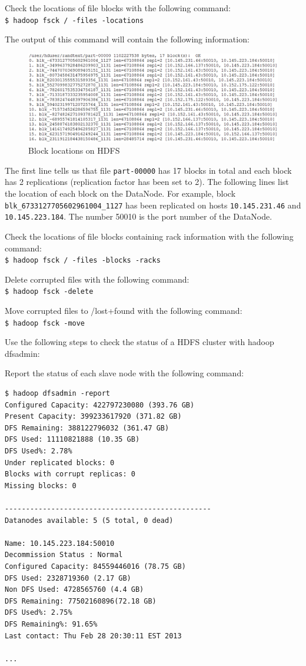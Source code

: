 Check the locations of file blocks with the following command: \\
\verb|$ hadoop fsck / -files -locations|

The output of this command will contain the following information:
\begin{figure}[h]
  \centering
  \includegraphics[width=\textwidth]{figs/5163os_04_07.png}
  \caption{Block locations on HDFS}\label{fig:hdfs.block.locations}
\end{figure} 

The first line tells us that file \verb|part-00000| has 17 blocks in total and each block has 2 replications (replication factor has been set to 2). The following lines list the location of each block on the DataNode. For example, block \verb|blk_6733127705602961004_1127| has been replicated on hosts \verb|10.145.231.46| and \verb|10.145.223.184|. The number 50010 is the port number of the DataNode.

Check the locations of file blocks containing rack information with the following command: \\
\verb|$ hadoop fsck / -files -blocks -racks|

Delete corrupted files with the following command:\\
\verb|$ hadoop fsck -delete|

Move corrupted files to /lost+found with the following command: \\
\verb|$ hadoop fsck -move|

Use the following steps to check the status of a HDFS cluster with hadoop dfsadmin:

Report the status of each slave node with the following command: 
\begin{verbatim}
$ hadoop dfsadmin -report
Configured Capacity: 422797230080 (393.76 GB)
Present Capacity: 399233617920 (371.82 GB)
DFS Remaining: 388122796032 (361.47 GB)
DFS Used: 11110821888 (10.35 GB)
DFS Used%: 2.78%
Under replicated blocks: 0
Blocks with corrupt replicas: 0
Missing blocks: 0

-------------------------------------------------
Datanodes available: 5 (5 total, 0 dead)

Name: 10.145.223.184:50010
Decommission Status : Normal
Configured Capacity: 84559446016 (78.75 GB)
DFS Used: 2328719360 (2.17 GB)
Non DFS Used: 4728565760 (4.4 GB)
DFS Remaining: 77502160896(72.18 GB)
DFS Used%: 2.75%
DFS Remaining%: 91.65%
Last contact: Thu Feb 28 20:30:11 EST 2013

...

\end{verbatim}

